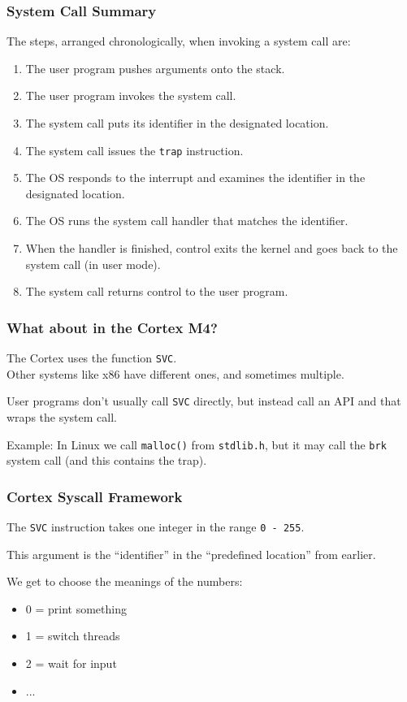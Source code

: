\begin{frame}
	\frametitle{System Call Summary}

	The steps, arranged chronologically, when invoking a system call are:
	\begin{enumerate}
		\item The user program pushes arguments onto the stack.
		\item The user program invokes the system call.
		\item The system call puts its identifier in the designated location.
		\item The system call issues the \texttt{trap} instruction.
		\item The OS responds to the interrupt and examines the identifier in the designated location.
		\item The OS runs the system call handler that matches the identifier.
		\item When the handler is finished, control exits the kernel and goes back to the system call (in user mode).
		\item The system call returns control to the user program.

	\end{enumerate}


\end{frame}

\begin{frame}
\frametitle{What about in the Cortex M4?}

The Cortex uses the function \texttt{SVC}.\\
\quad Other systems like x86 have different ones, and sometimes multiple.

User programs don't usually call \texttt{SVC} directly, but instead call an API and that wraps the system call.

Example: In Linux we call \texttt{malloc()} from \texttt{stdlib.h}, but it may call the \texttt{brk} system call (and this contains the trap).

\end{frame}

\begin{frame}
\frametitle{Cortex Syscall Framework}

The \texttt{SVC} instruction takes one integer in the range \texttt{0 - 255}.

This argument is the ``identifier'' in the ``predefined location'' from earlier.

We get to choose the meanings of the numbers:\\
\begin{itemize}
	\item 0 = print something
	\item 1 = switch threads
	\item 2 = wait for input
	\item ...
\end{itemize}

\end{frame}

